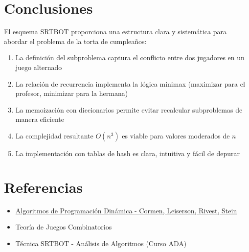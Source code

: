 \documentclass[12pt,letterpaper]{article}
\begin{document}
\section{Conclusiones}

El esquema SRTBOT proporciona una estructura clara y sistemática para abordar el problema de la torta de cumpleaños:

\begin{enumerate}
    \item La definición del subproblema captura el conflicto entre dos jugadores en un juego alternado
    \item La relación de recurrencia implementa la lógica minimax (maximizar para el profesor, minimizar para la hermana)
    \item La memoización con diccionarios permite evitar recalcular subproblemas de manera eficiente
    \item La complejidad resultante $O(n^3)$ es viable para valores moderados de $n$
    \item La implementación con tablas de hash es clara, intuitiva y fácil de depurar
\end{enumerate}

\section{Referencias}

\begin{itemize}
    \item \href{https://github.com/Zelechos/Introduccion_a_los_Algoritmos/blob/main/Introduction_to_Algorithms_Third_Edition_(2009).pdf}{Algoritmos de Programación Dinámica - Cormen, Leiserson, Rivest, Stein}
    \item Teoría de Juegos Combinatorios
    \item Técnica SRTBOT - Análisis de Algoritmos (Curso ADA)
\end{itemize}
\end{document}
